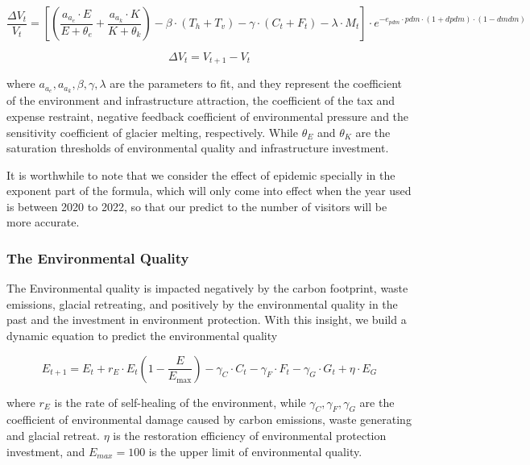 \documentclass{mcmthesis}
\begin{document}
\begin{equation}
  \frac{\Delta V_t}{V_t} = \left[\left(\frac{a_{a_e}\cdot E}{E+\theta_e} + \frac{a_{a_k}\cdot K}{K+\theta_k} \right) - \beta\cdot(T_h+T_v) - \gamma\cdot(C_t+F_t) - \lambda\cdot M_t \right] \cdot e^{-e_{pdm} \cdot pdm \cdot (1 + dpdm) \cdot (1 - dmdm)}
\end{equation}

\begin{equation}
  \Delta V_t = V_{t+1} - V_t
\end{equation}

where $a_{a_e}, a_{a_k}, \beta, \gamma, \lambda$ are the parameters to fit, and they represent 
the coefficient of the environment and infrastructure attraction, the coefficient of the tax and expense restraint,
negative feedback coefficient of environmental pressure and the sensitivity coefficient of glacier melting, respectively.
While $\theta_E$ and $\theta_K$ are the saturation thresholds of environmental quality and infrastructure investment.

It is worthwhile to note that we consider the effect of epidemic specially in the exponent part of the formula, 
which will only come into effect when the year used is between 2020 to 2022, so that our predict to the number of 
visitors will be more accurate.

\subsubsection{The Environmental Quality}
The Environmental quality is impacted negatively by the carbon footprint, waste emissions, glacial retreating, and 
positively by the environmental quality in the past and the investment in environment protection. With this
insight, we build a dynamic equation to predict the environmental quality

\begin{equation}
  E_{t+1} = E_t + r_E \cdot E_t \left(1 - \frac{E}{E_{\text{max}}}\right) - \gamma_C \cdot C_t - \gamma_F \cdot F_t - \gamma_G \cdot G_t + \eta \cdot E_G
\end{equation}

where $r_E$ is the rate of self-healing of the environment, while $\gamma_C, \gamma_F, \gamma_G$ are the coefficient of 
environmental damage caused by carbon emissions, waste generating and glacial retreat. $\eta$ is the restoration efficiency of 
environmental protection investment, and $E_{max} = 100$ is the upper limit of environmental quality.
\end{document}
